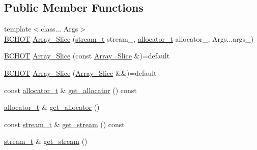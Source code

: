 \subsection*{Public Member Functions}
\begin{DoxyCompactItemize}
\item 
{\footnotesize template$<$class... Args$>$ }\\\hyperlink{BlackCat__Common_8h_ac085f07cc309e3aac24aa3fc0a40f6d2}{B\+C\+H\+OT} \hyperlink{classBC_1_1tensors_1_1exprs_1_1Array__Slice_a258f8311b24278d8b2789755a2b5c59b}{Array\+\_\+\+Slice} (\hyperlink{classBC_1_1tensors_1_1exprs_1_1Array__Slice_a5395d730cd39e49ff6695a3294b4be5f}{stream\+\_\+t} stream\+\_\+, \hyperlink{classBC_1_1tensors_1_1exprs_1_1Array__Slice_aa0bee33cbbb4ea522d89aefa986b6584}{allocator\+\_\+t} allocator\+\_\+, Args...\+args\+\_\+)
\item 
\hyperlink{BlackCat__Common_8h_ac085f07cc309e3aac24aa3fc0a40f6d2}{B\+C\+H\+OT} \hyperlink{classBC_1_1tensors_1_1exprs_1_1Array__Slice_a48f3e7cca6b46d825488d7c29e101942}{Array\+\_\+\+Slice} (const \hyperlink{classBC_1_1tensors_1_1exprs_1_1Array__Slice}{Array\+\_\+\+Slice} \&)=default
\item 
\hyperlink{BlackCat__Common_8h_ac085f07cc309e3aac24aa3fc0a40f6d2}{B\+C\+H\+OT} \hyperlink{classBC_1_1tensors_1_1exprs_1_1Array__Slice_a2fbf29b59907dca910979de4921790ef}{Array\+\_\+\+Slice} (\hyperlink{classBC_1_1tensors_1_1exprs_1_1Array__Slice}{Array\+\_\+\+Slice} \&\&)=default
\item 
const \hyperlink{classBC_1_1tensors_1_1exprs_1_1Array__Slice_aa0bee33cbbb4ea522d89aefa986b6584}{allocator\+\_\+t} \& \hyperlink{classBC_1_1tensors_1_1exprs_1_1Array__Slice_ad35ebf0a4f818fc38b1976e4b917f63e}{get\+\_\+allocator} () const 
\item 
\hyperlink{classBC_1_1tensors_1_1exprs_1_1Array__Slice_aa0bee33cbbb4ea522d89aefa986b6584}{allocator\+\_\+t} \& \hyperlink{classBC_1_1tensors_1_1exprs_1_1Array__Slice_a3700a7d19ba9e80da45d40037a14b133}{get\+\_\+allocator} ()
\item 
const \hyperlink{classBC_1_1tensors_1_1exprs_1_1Array__Slice_a5395d730cd39e49ff6695a3294b4be5f}{stream\+\_\+t} \& \hyperlink{classBC_1_1tensors_1_1exprs_1_1Array__Slice_ae293508a48d82c01bc43c10e6102aa20}{get\+\_\+stream} () const 
\item 
\hyperlink{classBC_1_1tensors_1_1exprs_1_1Array__Slice_a5395d730cd39e49ff6695a3294b4be5f}{stream\+\_\+t} \& \hyperlink{classBC_1_1tensors_1_1exprs_1_1Array__Slice_a6fb03e660a3b4f3941d6419d71895ce4}{get\+\_\+stream} ()
\end{DoxyCompactItemize}

